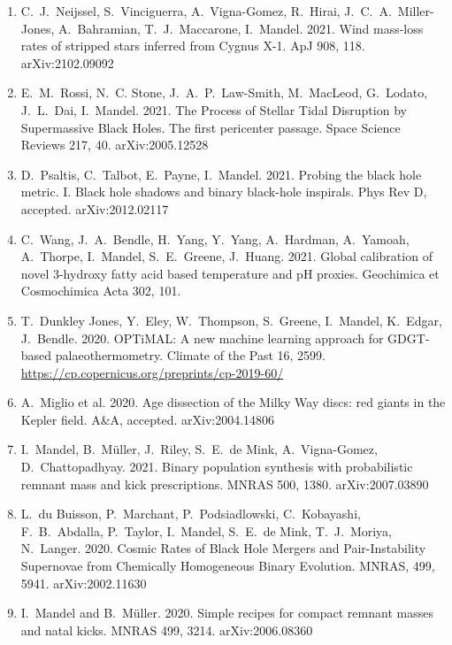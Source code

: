 \documentclass[margin,line]{res}
\begin{document}
\begin{resume}
\begin{enumerate}
\item C.~J.~Neijssel, S.~Vinciguerra, A.~Vigna-Gomez, R.~Hirai, J.~C.~A.~Miller-Jones, A.~Bahramian, T.~J.~Maccarone, I.~Mandel.  2021.  Wind mass-loss rates of stripped stars inferred from Cygnus X-1. ApJ 908, 118.  arXiv:2102.09092

\item E.~M.~Rossi, N.~C. Stone, J.~A.~P.~Law-Smith, M.~MacLeod, G.~Lodato, J.~L.~Dai, I.~Mandel.  2021.  The Process of Stellar Tidal Disruption by Supermassive Black Holes. The first pericenter passage.  Space Science Reviews 217, 40.  arXiv:2005.12528

\item D.~Psaltis, C.~Talbot, E.~Payne, I.~Mandel.  2021. Probing the black hole metric. I. Black hole shadows and binary black-hole inspirals.  Phys Rev D, accepted. arXiv:2012.02117

\item C.~Wang, J.~A.~Bendle,  H.~Yang, Y.~Yang, A.~Hardman, A.~Yamoah, A.~Thorpe, I.~Mandel, S.~E.~Greene, J.~Huang.  2021. Global calibration of novel 3-hydroxy fatty acid based temperature and pH proxies.  Geochimica et Cosmochimica Acta 302, 101. 

\item T.~Dunkley Jones, Y.~Eley, W.~Thompson, S.~Greene, I.~Mandel, K.~Edgar, J.~Bendle.  2020.  OPTiMAL: A new machine learning approach for GDGT-based palaeothermometry.  Climate of the Past 16, 2599.  \url{https://cp.copernicus.org/preprints/cp-2019-60/}

\item A.~Miglio et al. 2020. Age dissection of the Milky Way discs: red giants in the Kepler field.  A\&A, accepted.  arXiv:2004.14806

\item I.~Mandel, B.~M\"{u}ller, J.~Riley, S.~E.~de Mink, A.~Vigna-Gomez, D.~Chattopadhyay. 2021.  Binary population synthesis with probabilistic remnant mass and kick prescriptions. MNRAS 500, 1380.   arXiv:2007.03890

\item L.~du Buisson, P.~Marchant, P.~Podsiadlowski, C.~Kobayashi, F.~B.~Abdalla, P.~Taylor, I.~Mandel, S.~E.~de Mink, T.~J.~Moriya, N.~Langer.  2020. Cosmic Rates of Black Hole Mergers and Pair-Instability Supernovae from Chemically Homogeneous Binary Evolution. MNRAS, 499, 5941.  arXiv:2002.11630

\item I.~Mandel and B.~M\"{u}ller. 2020. Simple recipes for compact remnant masses and natal kicks.  MNRAS 499, 3214.  arXiv:2006.08360


\end{enumerate}
\end{resume}
\end{document}
